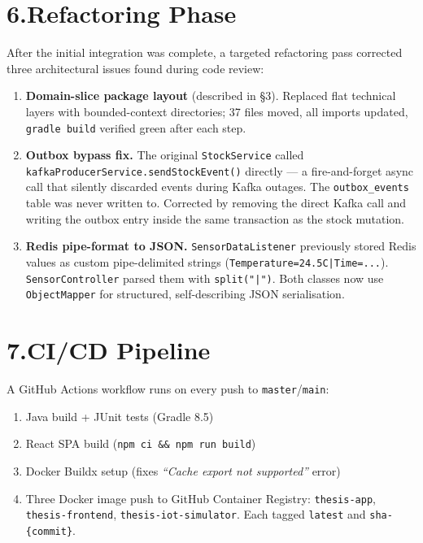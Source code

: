 \documentclass[11pt,a4paper]{article}
\begin{document}
\section*{6.\quad Refactoring Phase}

After the initial integration was complete, a targeted refactoring pass
corrected three architectural issues found during code review:

\begin{enumerate}[leftmargin=1.5cm, label=\textbf{R\arabic*.}]
  \item \textbf{Domain-slice package layout} (described in \S3).
        Replaced flat technical layers with bounded-context directories;
        37 files moved, all imports updated, \texttt{gradle build} verified
        green after each step.

  \item \textbf{Outbox bypass fix.}
        The original \texttt{StockService} called
        \texttt{kafkaProducerService.sendStockEvent()} directly --- a
        fire-and-forget async call that silently discarded events during
        Kafka outages. The \texttt{outbox\_events} table was never written to.
        Corrected by removing the direct Kafka call and writing the outbox
        entry inside the same transaction as the stock mutation.

  \item \textbf{Redis pipe-format to JSON.}
        \texttt{SensorDataListener} previously stored Redis values as
        custom pipe-delimited strings
        (\texttt{Temperature=24.5\textdegree{}C|Time=...}).
        \texttt{SensorController} parsed them with \texttt{split("|")}.
        Both classes now use \texttt{ObjectMapper} for structured,
        self-describing JSON serialisation.
\end{enumerate}

\section*{7.\quad CI/CD Pipeline}

A GitHub Actions workflow runs on every push to \texttt{master}/\texttt{main}:

\begin{enumerate}[noitemsep, leftmargin=1.5cm]
  \item Java build + JUnit tests (Gradle 8.5)
  \item React SPA build (\texttt{npm ci \&\& npm run build})
  \item Docker Buildx setup (fixes \emph{``Cache export not supported''} error)
  \item Three Docker image push to GitHub Container Registry:
        \texttt{thesis-app}, \texttt{thesis-frontend}, \texttt{thesis-iot-simulator}.
        Each tagged \texttt{latest} and \texttt{sha-\{commit\}}.
\end{enumerate}
\end{document}
